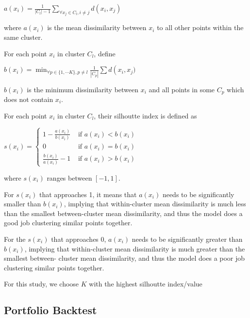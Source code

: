 \documentclass[11pt,preprint, authoryear]{elsarticle}
\numberwithin{equation}{section}
\numberwithin{figure}{section}
\numberwithin{table}{section}
\begin{document}
\(a\left(x_i\right)=\frac{1}{\left|C_l\right|-1} \sum_{\forall x_j \in C_l, i \neq j} d\left(x_i, x_j\right)\)

where \(a(x_i)\) is the mean dissimilarity between \(x_i\) to all other
points within the same cluster.

For each point \(x_i\) in cluster \(C_l\), define

\(b\left(x_i\right)=\min _{\forall p \in\{1, \cdots K\}, p \neq l} \frac{1}{\left|C_p\right|} \sum d\left(x_i, x_j\right.)\)

\(b(x_i)\) is the minimum dissimilarity between \(x_i\) and all points
in some \(C_p\) which does not contain \(x_i\).

For each point \(x_i\) in cluster \(C_l\), their silhoutte index is
defined as

\(s\left(x_i\right)= \begin{cases}1-\frac{a\left(x_i\right)}{b\left(x_i\right)} & \text { if } a\left(x_i\right)<b\left(x_i\right) \\ 0 & \text { if } a\left(x_i\right)=b\left(x_i\right) \\ \frac{b\left(x_i\right)}{a\left(x_i\right)}-1 & \text { if } a\left(x_i\right)>b\left(x_i\right)\end{cases}\)

where \(s(x_i)\) ranges between \([-1, 1]\).

For \(s(x_i)\) that approaches 1, it means that \(a(x_i)\) needs to be
significantly smaller than \(b(x_i)\), implying that within-cluster mean
dissimilarity is much less than the smallest between-cluster mean
dissimilarity, and thus the model does a good job clustering similar
points together.

For the \(s(x_i)\) that approaches 0, \(a(x_i)\) needs to be
significantly greater than \(b(x_i)\), implying that within-cluster mean
dissimilarity is much greater than the smallest between- cluster mean
dissimilarity, and thus the model does a poor job clustering similar
points together.

For this study, we choose \(K\) with the highest silhoutte index/value

\hypertarget{portfolio-backtest}{%
\subsection{Portfolio Backtest}\label{portfolio-backtest}}
\end{document}

